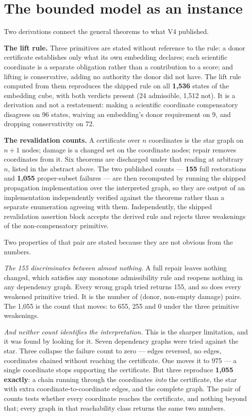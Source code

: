 \section{The bounded model as an instance}

Two derivations connect the general theorems to what V4 published.

\textbf{The lift rule.} Three primitives are stated without reference to the rule:
a donor certificate establishes only what its own embedding declares; each
scientific coordinate is a separate obligation rather than a contribution to a
score; and lifting is conservative, adding no authority the donor did not have.
The lift rule computed from them reproduces the shipped rule on all \textbf{1,536}
states of the embedding cube, with both verdicts present (24 admissible, 1,512
not). It is a derivation and not a restatement: making a scientific coordinate
compensatory disagrees on 96 states, waiving an embedding's donor requirement on
9, and dropping conservativity on 72.

\textbf{The revalidation counts.} A certificate over $n$ coordinates is the star
graph on $n+1$ nodes; damage is a changed set on the coordinate nodes; repair
removes coordinates from it. Six theorems are discharged under that reading at
arbitrary $n$, listed in the abstract above. The two published counts ---
\textbf{155} full restorations and \textbf{1,055} proper-subset failures --- are then
recomputed by running the shipped propagation implementation over the
interpreted graph, so they are output of an implementation independently
verified against the theorems rather than a separate enumeration agreeing with
them. Independently, the shipped revalidation assertion block accepts the
derived rule and rejects three weakenings of the non-compensatory primitive.

Two properties of that pair are stated because they are not obvious from the
numbers.

\emph{The 155 discriminates between almost nothing.} A full repair leaves nothing
changed, which satisfies any monotone admissibility rule and reopens nothing in
any dependency graph. Every wrong graph tried returns 155, and so does every
weakened primitive tried. It is the number of (donor, non-empty damage) pairs.
The 1,055 is the count that moves: to 655, 255 and 0 under the three primitive
weakenings.

\emph{And neither count identifies the interpretation.} This is the sharper
limitation, and it was found by looking for it. Seven dependency graphs were
tried against the star. Three collapse the failure count to zero --- edges
reversed, no edges, coordinates chained without reaching the certificate. One
moves it to 975 --- a single coordinate stops supporting the certificate. But
three reproduce \textbf{1,055 exactly}: a chain running through the coordinates \emph{into}
the certificate, the star with extra coordinate-to-coordinate edges, and the
complete graph. The pair of counts tests whether every coordinate reaches the
certificate, and nothing beyond that; every graph in that reachability class
returns the same two numbers.

